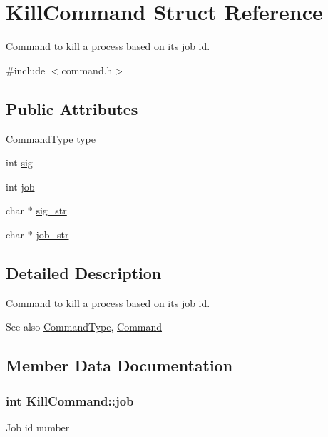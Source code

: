 \hypertarget{structKillCommand}{}\section{Kill\+Command Struct Reference}
\label{structKillCommand}


\hyperlink{unionCommand}{Command} to kill a process based on it\textquotesingle{}s job id.  




{\ttfamily \#include $<$command.\+h$>$}

\subsection*{Public Attributes}
\begin{DoxyCompactItemize}
\item 
\hyperlink{command_8h_a21e038f5b8958e203d28bc4f18472352}{Command\+Type} \hyperlink{structKillCommand_a9cd678bc0659f74340e3fca28766bcda}{type}
\item 
int \hyperlink{structKillCommand_a20f5367bbec80a936189c57b1f9db351}{sig}
\item 
int \hyperlink{structKillCommand_abd4689c605a3dfe202a1779f0d1191ae}{job}
\item 
char $\ast$ \hyperlink{structKillCommand_a879a36b90427ec640bef5c92a6c9c24e}{sig\+\_\+str}
\item 
char $\ast$ \hyperlink{structKillCommand_a174a9714a69550b0bbf611e59bfbf332}{job\+\_\+str}
\end{DoxyCompactItemize}


\subsection{Detailed Description}
\hyperlink{unionCommand}{Command} to kill a process based on it\textquotesingle{}s job id. 

\begin{DoxySeeAlso}{See also}
\hyperlink{command_8h_aa8311e0de296df9816965be35c31d925}{Command\+Type}, \hyperlink{unionCommand}{Command} 
\end{DoxySeeAlso}


\subsection{Member Data Documentation}
\subsubsection[{\texorpdfstring{job}{job}}]{\setlength{\rightskip}{0pt plus 5cm}int Kill\+Command\+::job}\hypertarget{structKillCommand_abd4689c605a3dfe202a1779f0d1191ae}{}\label{structKillCommand_abd4689c605a3dfe202a1779f0d1191ae}
Job id number 
